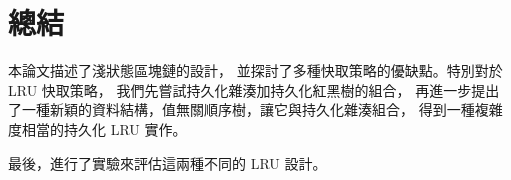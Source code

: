 \chapter{總結}

本論文描述了淺狀態區塊鏈的設計，
並探討了多種快取策略的優缺點。特別對於 LRU 快取策略，
我們先嘗試持久化雜湊加持久化紅黑樹的組合，
再進一步提出了一種新穎的資料結構，值無關順序樹，讓它與持久化雜湊組合，
得到一種複雜度相當的持久化 LRU 實作。

最後，進行了實驗來評估這兩種不同的 LRU 設計。